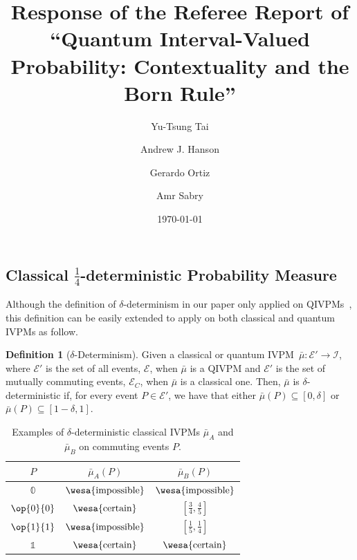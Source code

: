 \documentclass[english,reprint, aps, prl,superscriptaddress, showpacs,
showkeys, longbibliography, amsmath, amssymb, floatfix]{revtex4-1}
\theoremstyle{plain}
\theoremstyle{definition}
\newtheorem{definition}{Definition}
\newcommand{\events}{\ensuremath{\mathcal{E}}}
\newcommand{\imposs}{{\text{\wesa{impossible}}}}
\newcommand{\necess}{{\text{\wesa{certain}}}}
\newcommand{\proj}[1]{\op{#1}{#1}}
\newcommand{\eventsC}{\ensuremath{\events_{C}}}
\begin{document}
\title{Response of the Referee Report of ``Quantum Interval-Valued Probability:
Contextuality and the Born Rule''}

\author{Yu-Tsung Tai}

\author{Andrew J. Hanson}

\author{Gerardo Ortiz}

\author{Amr Sabry}

\date{\today}

\maketitle

\subsection{Classical $\frac{1}{4}$-deterministic Probability Measure}

Although the definition of $\delta$-determinism in our paper only
applied on QIVPMs~\cite{THOS2017}, this definition can be easily
extended to apply on both classical and quantum IVPMs as follow.

\begin{definition}[$\delta$-Determinism]\label{def:delta-deterministic}
Given a classical or quantum IVPM~$\bar{\mu}:\events'\rightarrow\mathscr{I}$,
where $\events'$ is the set of all events, $\events$, when $\bar{\mu}$
is a QIVPM and $\events'$ is the set of mutually commuting events,
$\eventsC$, when $\bar{\mu}$ is a classical one. Then, $\bar{\mu}$
is $\delta$-deterministic if, for every event $P\in\events'$, we
have that either $\bar{\mu}\left(P\right)\subseteq\left[0,\delta\right]$
or $\bar{\mu}\left(P\right)\subseteq\left[1-\delta,1\right]$. \end{definition}

\begin{table}
\noindent \centering{}\caption{\label{tab:classical-IVPMs}Examples of $\delta$-deterministic classical
IVPMs $\bar{\mu}_{A}$ and $\bar{\mu}_{B}$ on commuting events $P$.}
\begin{tabular}{ccc}
\toprule 
\addlinespace
$P$  & $\bar{\mu}_{A}(P)$  & $\bar{\mu}_{B}(P)$ \tabularnewline
\midrule
\midrule 
\addlinespace
$\mathbb{0}$  & $\imposs$  & $\imposs$ \tabularnewline
\midrule 
\addlinespace
$\proj{0}$  & $\necess$  & $\left[\frac{3}{4},\frac{4}{5}\right]$ \tabularnewline
\midrule 
\addlinespace
$\proj{1}$  & $\imposs$  & $\left[\frac{1}{5},\frac{1}{4}\right]$ \tabularnewline
\midrule 
\addlinespace
$\mathbb{1}$  & $\necess$  & $\necess$ \tabularnewline
\bottomrule
\end{tabular}
\end{table}
\end{document}
